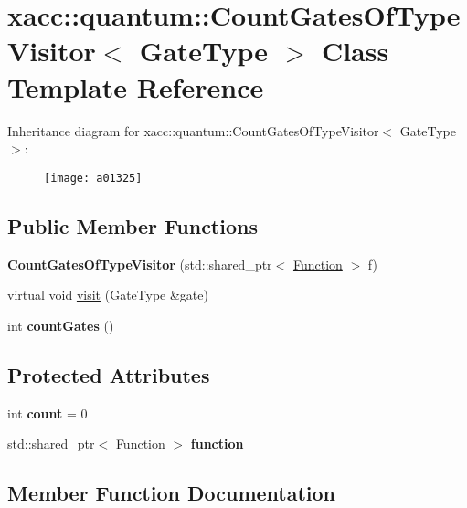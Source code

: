 \hypertarget{a01325}{}\section{xacc\+:\+:quantum\+:\+:Count\+Gates\+Of\+Type\+Visitor$<$ Gate\+Type $>$ Class Template Reference}
\label{a01325}
Inheritance diagram for xacc\+:\+:quantum\+:\+:Count\+Gates\+Of\+Type\+Visitor$<$ Gate\+Type $>$\+:\begin{figure}[H]
\begin{center}
\leavevmode
\texttt{[image: a01325]}
\end{center}
\end{figure}
\subsection*{Public Member Functions}
\begin{DoxyCompactItemize}
\item 
\mbox{\label{a01325_a4c2507e3ee4fe51e7ff4501bf5569cfc}} 
{\bfseries Count\+Gates\+Of\+Type\+Visitor} (std\+::shared\+\_\+ptr$<$ \hyperlink{a01653}{Function} $>$ f)
\item 
virtual void \hyperlink{a01325_a9c40e6cb4b74e2d6714c531ffc3b2909}{visit} (Gate\+Type \&gate)
\item 
\mbox{\label{a01325_a8a1a17ed50cd6727c2eb07976f886389}} 
int {\bfseries count\+Gates} ()
\end{DoxyCompactItemize}
\subsection*{Protected Attributes}
\begin{DoxyCompactItemize}
\item 
\mbox{\label{a01325_ae3d8ae4c40c1552ee68aa6e5002e42bd}} 
int {\bfseries count} = 0
\item 
\mbox{\label{a01325_a202ab6e0e365af735da706fe972333e7}} 
std\+::shared\+\_\+ptr$<$ \hyperlink{a01653}{Function} $>$ {\bfseries function}
\end{DoxyCompactItemize}


\subsection{Member Function Documentation}
\mbox{\label{a01325_a9c40e6cb4b74e2d6714c531ffc3b2909}} 
